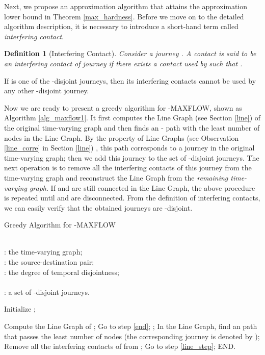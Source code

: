 \documentclass[10pt, conference, letterpaper]{IEEEtran}
\newtheorem{definition}{Definition}
\begin{document}
Next, we propose an approximation algorithm that attains the approximation lower bound in Theorem \ref{max_hardness}. Before we move on to the detailed algorithm description, it is necessary to introduce a short-hand term called \emph{interfering contact}.

\begin{definition}[{Interfering Contact}]
Consider a journey . A contact  is said to be an interfering contact of journey  if there exists a contact  used by  such that .
\end{definition}

\noindent If  is one of the -disjoint journeys, then its interfering contacts cannot be used by any other -disjoint journey.

Now we are ready to present a greedy algorithm for -MAXFLOW, shown as Algorithm \ref{alg_maxflow1}. It first computes the Line Graph (see Section \ref{line}) of the original time-varying graph and then finds an - path with the least number of nodes in the Line Graph. By the property of Line Graphs (see Observation \ref{line_corre} in Section \ref{line}) , this path corresponds to a journey in the original time-varying graph; then we add this journey to the set of -disjoint journeys. The next operation is to remove all the interfering contacts of this journey from the time-varying graph and reconstruct the Line Graph from the \emph{remaining time-varying graph}. If  and  are still connected in the Line Graph, the above procedure is repeated until  and  are disconnected. From the definition of interfering contacts, we can easily  verify that the obtained journeys are -disjoint.
\begin{algorithm}[ht]
 \caption{Greedy Algorithm for -MAXFLOW}\label{alg_maxflow1}
    \begin{algorithmic}[1]
\REQUIRE ~~\\

: the time-varying graph;\\
: the source-destination pair;\\
: the degree of temporal disjointness;\\

\ENSURE ~~\\

: a set of -disjoint journeys.

\vspace{1mm}

\STATE Initialize ;

\STATE Compute the Line Graph of ;\label{line_step}
\STATE Go to step \ref{end};
\ENDIF \label{a3}
\STATE ;
\STATE In the Line Graph, find an  path  that passes the least number of nodes (the corresponding journey is denoted by );\label{a1}
\STATE Remove all the interfering contacts of  from ;\label{a2}
\STATE Go to step \ref{line_step};
\STATE END.\label{end}
\end{algorithmic}
\end{algorithm}
\end{document}
